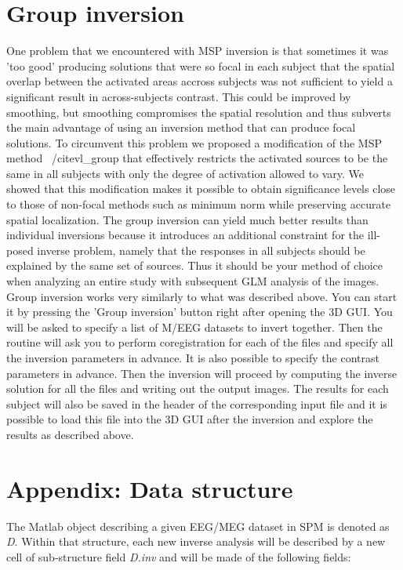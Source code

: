 \section{Group inversion}
One problem that we encountered with MSP inversion is that sometimes it was 'too good' producing solutions that were so focal in each subject that the spatial overlap between the activated
areas accross subjects was not sufficient to yield a significant result in across-subjects contrast. This could be improved by smoothing, but smoothing compromises the spatial resolution
and thus subverts the main advantage of using an inversion method that can produce focal solutions. To circumvent this problem we proposed a modification of the MSP method ~/cite{vl_group}
that effectively restricts the activated sources to be the same in all subjects with only the degree of activation allowed to vary. We showed that this modification makes it possible to 
obtain significance levels close to those of non-focal methods such as minimum norm while preserving accurate spatial localization. The group inversion can yield much better results
than individual inversions because it introduces an additional constraint for the ill-posed inverse problem, namely that the responses in all subjects should be explained 
by the same set of sources. Thus it should be your method of choice when analyzing an entire study with subsequent GLM analysis of the images. Group inversion works very similarly to
what was described above. You can start it by pressing the 'Group inversion' button right after opening the 3D GUI. You will be asked to specify a list of M/EEG datasets to invert together.
Then the routine will ask you to perform coregistration for each of the files and specify all the inversion parameters in advance. It is also possible to specify the contrast parameters in advance.
Then the inversion will proceed by computing the inverse solution for all the files and writing out the output images. The results for each subject will also be saved in the header 
of the corresponding input file and it is possible to load this file into the 3D GUI after the inversion and explore the results as described above. 

\section{Appendix: Data structure}
The Matlab object describing a given EEG/MEG dataset in SPM is denoted as \textit{D}. 
Within that structure, each new inverse analysis will be described by a new cell of sub-structure 
field \textit{D.inv} and will be made of the following fields:

